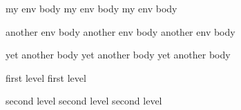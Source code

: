 \begin{myenv}
	my env body
	my env body
	my env body
\end{myenv}
\begin{anotherenv}
	another env body
	another env body
	another env body
\end{anotherenv}\begin{yetanother}
	yet another body
	yet another body
	yet another body
\end{yetanother}\begin{level1}
	first level
	first level
	\begin{level2}
		second level
		second level
		second level
	\end{level2}\end{level1}
